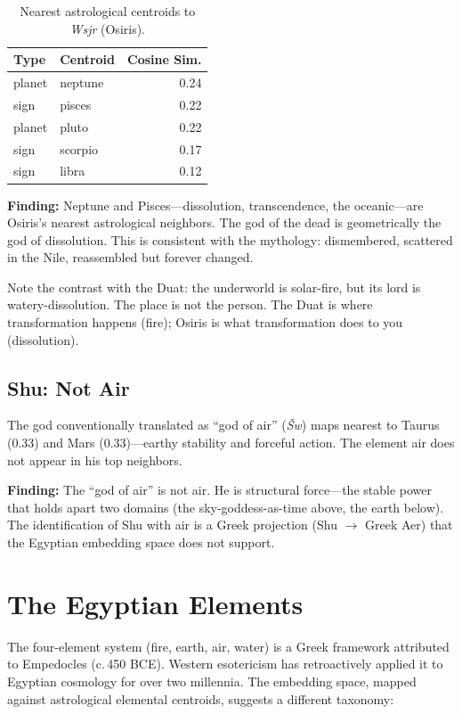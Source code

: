 \documentclass[11pt, a4paper]{article}
\begin{document}
\begin{table}[H]
\centering
\begin{tabular}{llr}
\toprule
\textbf{Type} & \textbf{Centroid} & \textbf{Cosine Sim.} \\
\midrule
planet & neptune & 0.24 \\
sign & pisces & 0.22 \\
planet & pluto & 0.22 \\
sign & scorpio & 0.17 \\
sign & libra & 0.12 \\
\bottomrule
\end{tabular}
\caption{Nearest astrological centroids to \textit{Wsjr} (Osiris).}
\end{table}

{\color{insight}\textbf{Finding:}} Neptune and Pisces---dissolution, transcendence, the oceanic---are Osiris's nearest astrological neighbors. The god of the dead is geometrically the god of dissolution. This is consistent with the mythology: dismembered, scattered in the Nile, reassembled but forever changed.

Note the contrast with the Duat: the underworld is solar-fire, but its lord is watery-dissolution. The place is not the person. The Duat is where transformation happens (fire); Osiris is what transformation does to you (dissolution).

\subsection{Shu: Not Air}

The god conventionally translated as ``god of air'' (\textit{Šw}) maps nearest to Taurus (0.33) and Mars (0.33)---earthy stability and forceful action. The element air does not appear in his top neighbors.

{\color{insight}\textbf{Finding:}} The ``god of air'' is not air. He is structural force---the stable power that holds apart two domains (the sky-goddess-as-time above, the earth below). The identification of Shu with air is a Greek projection (Shu $\rightarrow$ Greek Aer) that the Egyptian embedding space does not support.

\section{The Egyptian Elements}
\label{sec:elements}

The four-element system (fire, earth, air, water) is a Greek framework attributed to Empedocles (c.\,450 BCE). Western esotericism has retroactively applied it to Egyptian cosmology for over two millennia. The embedding space, mapped against astrological elemental centroids, suggests a different taxonomy:
\end{document}
